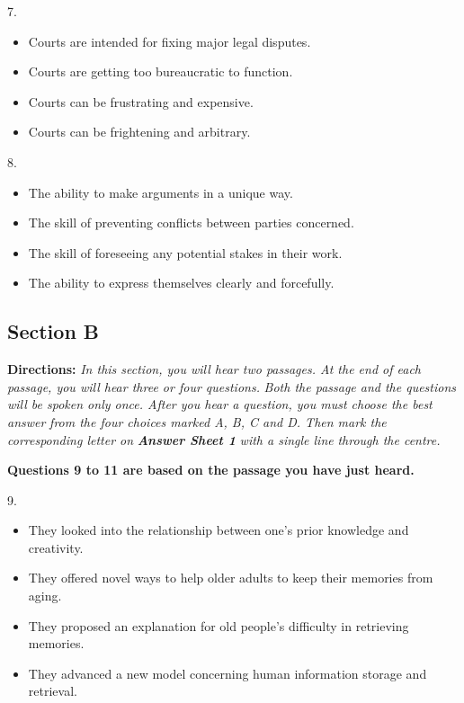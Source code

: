 \documentclass[UTF8,11pt]{ctexart}
\begin{document}
7.


\begin{itemize}[leftmargin=2em,itemsep=.2em,topsep=.4em]\item[A.] Courts are intended for fixing major legal disputes.
\item[B.] Courts are getting too bureaucratic to function.
\item[C.] Courts can be frustrating and expensive.
\item[D.] Courts can be frightening and arbitrary.
\end{itemize}

8.


\begin{itemize}[leftmargin=2em,itemsep=.2em,topsep=.4em]\item[A.] The ability to make arguments in a unique way.
\item[B.] The skill of preventing conflicts between parties concerned.
\item[C.] The skill of foreseeing any potential stakes in their work.
\item[D.] The ability to express themselves clearly and forcefully.
\end{itemize}

\subsection*{\textbf{Section B}}


\textbf{Directions:} \textit{In this section, you will hear two passages. At the end of each passage, you will hear three or four questions.} \textit{Both the passage and the questions will be spoken only once. After you hear a question, you must choose the best answer} \textit{from the four choices marked A, B, C and D. Then mark the corresponding letter on }\textbf{\textit{Answer Sheet 1}}\textit{ with a single line} \textit{through the centre.}


\textbf{Questions 9 to 11 are based on the passage you have just heard.}


9.


\begin{itemize}[leftmargin=2em,itemsep=.2em,topsep=.4em]\item[A.] They looked into the relationship between one’s prior knowledge and creativity.
\end{itemize}

\begin{itemize}[leftmargin=2em,itemsep=.2em,topsep=.4em]\item[B.] They offered novel ways to help older adults to keep their memories from aging.
\item[C.] They proposed an explanation for old people’s difficulty in retrieving memories.
\item[D.] They advanced a new model concerning human information storage and retrieval.
\end{itemize}
\end{document}
